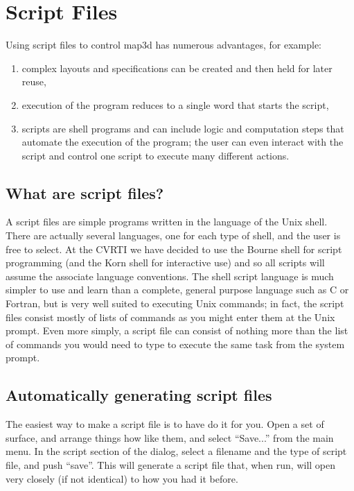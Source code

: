 \section{Script Files}
\label{sec:scripts} 

Using script files to control map3d has numerous advantages, for example:

\begin{enumerate}
  \item complex layouts and specifications can be created and then held
        for later reuse,
  \item execution of the program reduces to a single word that starts the
        script,
  \item scripts are shell programs and can include logic and computation
        steps that automate the execution of the program; the user can even
        interact with the script and control one script to execute many
        different actions.
\end{enumerate}

\subsection{What are script files?}

A script files are simple programs written in the language of the Unix
shell.  There are actually several languages, one for each type of shell,
and the user is free to select.  At the CVRTI we have decided to use the
Bourne shell for script programming (and the Korn shell for interactive
use) and so all scripts will assume the associate language conventions.
The shell script language is much simpler to use and learn than a complete,
general purpose language such as C or Fortran, but is very well suited to
executing Unix commands; in fact, the script files consist mostly of lists
of commands as you might enter them at the Unix prompt.  Even more simply,
a script file can consist of nothing more than the list of commands you
would need to type to execute the same task from the system prompt.

\subsection{Automatically generating script files}
The easiest way to make a script file is to have \map{} do it for you.  Open a set
of surface, and arrange things how like them, and select ``Save...'' from the main menu.
In the script section of the dialog, select a filename and the type of script file, and 
push ``save''.  This will generate a script file that, when run, will open \map{} very closely
(if not identical) to how you had it before.

